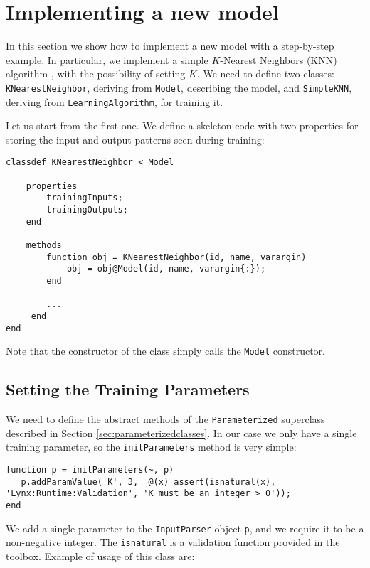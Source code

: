 \section{Implementing a new model}

In this section we show how to implement a new model with a step-by-step example. In particular, we implement a simple $K$-Nearest Neighbors (KNN) algorithm \cite{alpaydin2004introduction}, with the possibility of setting $K$. We need to define two classes: \verb|KNearestNeighbor|, deriving from \verb|Model|, describing the model, and \verb|SimpleKNN|, deriving from \verb|LearningAlgorithm|, for training it.

Let us start from the first one. We define a skeleton code with two properties for storing the input and output patterns seen during training:

\begin{lstlisting}
classdef KNearestNeighbor < Model
    
    properties
        trainingInputs;
        trainingOutputs;
    end
    
    methods
        function obj = KNearestNeighbor(id, name, varargin)
            obj = obj@Model(id, name, varargin{:});
        end
        
        ...
     end
end
\end{lstlisting}

\noindent Note that the constructor of the class simply calls the \verb|Model| constructor.

\subsection{Setting the Training Parameters}

We need to define the abstract methods of the \verb|Parameterized| superclass described in Section \ref{sec:parameterizedclasses}. In our case we only have a single training parameter, so the \verb|initParameters| method is very simple:

\begin{lstlisting}
function p = initParameters(~, p)
   p.addParamValue('K', 3,  @(x) assert(isnatural(x), 'Lynx:Runtime:Validation', 'K must be an integer > 0'));
end
\end{lstlisting}

\noindent We add a single parameter to the \verb|InputParser| object \verb|p|, and we require it to be a non-negative integer. The \verb|isnatural| is a validation function provided in the toolbox. Example of usage of this class are:

